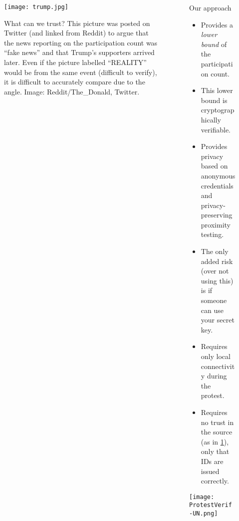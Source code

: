 \begin{columns}[t]
  \hfill

  \begin{column}{0.32\linewidth}

    \begin{figure}
      \centering
      \texttt{[image: trump.jpg]}
      \caption{%
        What can we trust?
        This picture was posted on Twitter (and linked from Reddit) to argue 
        that the news reporting on the participation count was \enquote{fake 
          news} and that Trump's supporters arrived later.
        Even if the picture labelled \enquote{REALITY} would be from the same 
        event (difficult to verify), it is difficult to accurately compare due 
        to the angle.
        Image: Reddit/The\_Donald, Twitter.
      }\label{TrumpInauguration}
    \end{figure}

  \end{column}

  \hfill

  \begin{column}{0.32\linewidth}

    \begin{greenblock}{Our approach}
      \begin{itemize}
        \item Provides a \emph{lower bound} of the participation count.
        \item This lower bound is cryptographically verifiable.
        \item Provides privacy based on anonymous credentials and 
          privacy-preserving proximity testing.
        \item The only added risk (over not using this) is if someone can use 
          your secret key.
        \item Requires only local connectivity during the protest.
        \item Requires no trust in the source (as in \cref{TrumpInauguration}), 
          only that IDs are issued correctly.
      \end{itemize}
    \end{greenblock}

    \texttt{[image: ProtestVerif-UN.png]}

  \end{column}

\end{columns}

\vfill

